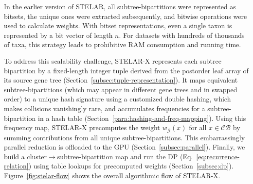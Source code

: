 \documentclass[10pt,a4paper]{article}
\newcommand{\addr}[1]{{\color{red} #1}}
\begin{document}
In the earlier version of STELAR,  all subtree-bipartitions were represented as bitsets, the unique ones were extracted subsequently, and bitwise operations were used to calculate weights. With bitset representations, even a single taxon is represented by a bit vector of length $n$. For datasets with hundreds of thousands of taxa, this strategy leads to prohibitive RAM consumption and running time.

To address this scalability challenge, STELAR-X represents each subtree bipartition by a fixed-length integer tuple derived from the postorder leaf array of its source gene tree (Section~\ref{subsec:tuple-representation}). It maps equivalent subtree-bipartitions (which may appear in different gene trees and in swapped order) to a unique hash signature using a customized double hashing, which makes collisions vanishingly rare, and accumulates frequencies for a subtree-bipartition in a hash table (Section~\ref{para:hashing-and-freq-mapping}).
Using this frequency map, STELAR-X precomputes the weight $w_{\mathcal{G}}(x)$ for all $x\in\mathcal{CB}$ by summing contributions from all unique subtree-bipartitions. This embarrassingly parallel reduction is offloaded to the GPU (Section~\ref{subsec:parallel}). Finally, we build a cluster$\to$subtree-bipartition map and run the DP (Eq.~\ref{eq:recurrence-relation}) using table lookups for precomputed weights (Section~\ref{subsec:dp}). Figure~\ref{fig:stelar-flow} shows the overall algorithmic flow of STELAR-X.


\end{document}
